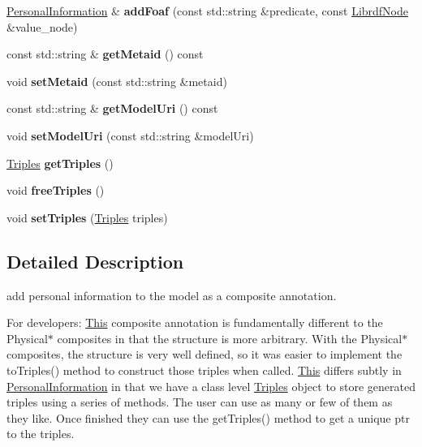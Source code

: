 \begin{DoxyCompactItemize}
\hyperlink{classomexmeta_1_1PersonalInformation}{Personal\+Information} \& {\bfseries add\+Foaf} (const std\+::string \&predicate, const \hyperlink{classredland_1_1LibrdfNode}{Librdf\+Node} \&value\+\_\+node)
\item 
\mbox{\label{classomexmeta_1_1PersonalInformation_ae00bfe55d51745ac11f37986443feb28}} 
const std\+::string \& {\bfseries get\+Metaid} () const
\item 
\mbox{\label{classomexmeta_1_1PersonalInformation_a2bf7f31511c545eb0158643645115b00}} 
void {\bfseries set\+Metaid} (const std\+::string \&metaid)
\item 
\mbox{\label{classomexmeta_1_1PersonalInformation_a6b2ce3a6c724b67afe3d0c2df00bb484}} 
const std\+::string \& {\bfseries get\+Model\+Uri} () const
\item 
\mbox{\label{classomexmeta_1_1PersonalInformation_afc5f378fc98d02112a9a569f4388552e}} 
void {\bfseries set\+Model\+Uri} (const std\+::string \&model\+Uri)
\item 
\mbox{\label{classomexmeta_1_1PersonalInformation_aecc5783753b41ed88a49c5b3bce82ba4}} 
\hyperlink{classomexmeta_1_1Triples}{Triples} {\bfseries get\+Triples} ()
\item 
\mbox{\label{classomexmeta_1_1PersonalInformation_aea3a34c765f176a3d6f6b88a6b8c8369}} 
void {\bfseries free\+Triples} ()
\item 
\mbox{\label{classomexmeta_1_1PersonalInformation_a25a1e9ba56dda2459cb1bbbe61cc4346}} 
void {\bfseries set\+Triples} (\hyperlink{classomexmeta_1_1Triples}{Triples} triples)
\end{DoxyCompactItemize}


\subsection{Detailed Description}
add personal information to the model as a composite annotation. 

For developers\+: \hyperlink{classThis}{This} composite annotation is fundamentally different to the Physical$\ast$ composites in that the structure is more arbitrary. With the Physical$\ast$ composites, the structure is very well defined, so it was easier to implement the to\+Triples() method to construct those triples when called. \hyperlink{classThis}{This} differs subtly in \hyperlink{classomexmeta_1_1PersonalInformation}{Personal\+Information} in that we have a class level \hyperlink{classomexmeta_1_1Triples}{Triples} object to store generated triples using a series of methods. The user can use as many or few of them as they like. Once finished they can use the get\+Triples() method to get a unique ptr to the triples. 

